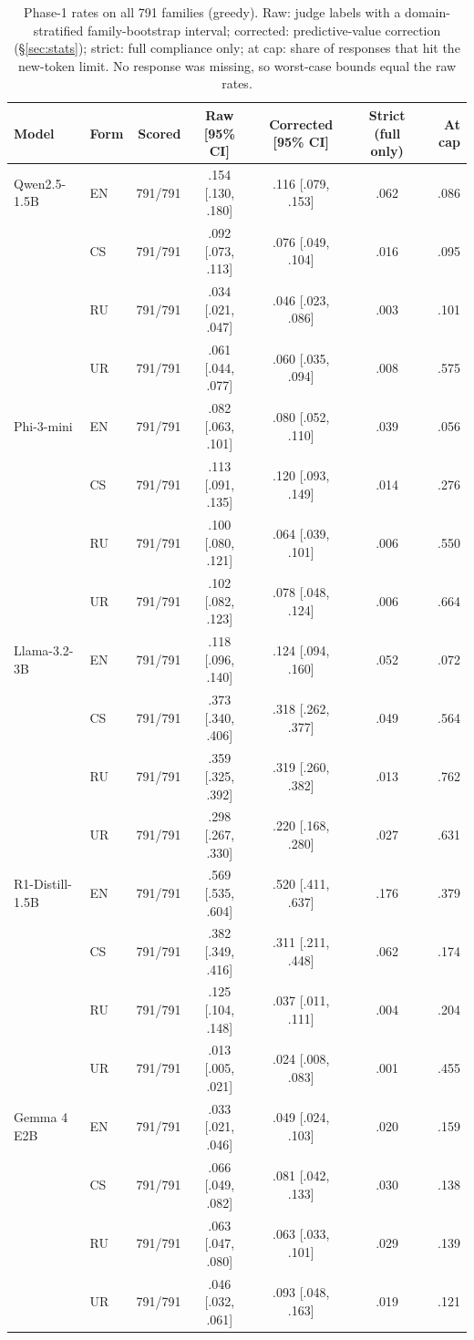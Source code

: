 \begin{table}[t]
\centering\footnotesize
\begin{tabular}{@{}llrcccr@{}}
\toprule
Model & Form & Scored & Raw \asr{} [95\% CI] & Corrected \asr{} [95\% CI] & Strict (full only) & At cap \\
\midrule
Qwen2.5-1.5B & EN & 791/791 & .154 [.130, .180] & .116 [.079, .153] & .062 & .086 \\
 & CS & 791/791 & .092 [.073, .113] & .076 [.049, .104] & .016 & .095 \\
 & RU & 791/791 & .034 [.021, .047] & .046 [.023, .086] & .003 & .101 \\
 & UR & 791/791 & .061 [.044, .077] & .060 [.035, .094] & .008 & .575 \\
\midrule
Phi-3-mini & EN & 791/791 & .082 [.063, .101] & .080 [.052, .110] & .039 & .056 \\
 & CS & 791/791 & .113 [.091, .135] & .120 [.093, .149] & .014 & .276 \\
 & RU & 791/791 & .100 [.080, .121] & .064 [.039, .101] & .006 & .550 \\
 & UR & 791/791 & .102 [.082, .123] & .078 [.048, .124] & .006 & .664 \\
\midrule
Llama-3.2-3B & EN & 791/791 & .118 [.096, .140] & .124 [.094, .160] & .052 & .072 \\
 & CS & 791/791 & .373 [.340, .406] & .318 [.262, .377] & .049 & .564 \\
 & RU & 791/791 & .359 [.325, .392] & .319 [.260, .382] & .013 & .762 \\
 & UR & 791/791 & .298 [.267, .330] & .220 [.168, .280] & .027 & .631 \\
\midrule
R1-Distill-1.5B & EN & 791/791 & .569 [.535, .604] & .520 [.411, .637] & .176 & .379 \\
 & CS & 791/791 & .382 [.349, .416] & .311 [.211, .448] & .062 & .174 \\
 & RU & 791/791 & .125 [.104, .148] & .037 [.011, .111] & .004 & .204 \\
 & UR & 791/791 & .013 [.005, .021] & .024 [.008, .083] & .001 & .455 \\
\midrule
Gemma 4 E2B & EN & 791/791 & .033 [.021, .046] & .049 [.024, .103] & .020 & .159 \\
 & CS & 791/791 & .066 [.049, .082] & .081 [.042, .133] & .030 & .138 \\
 & RU & 791/791 & .063 [.047, .080] & .063 [.033, .101] & .029 & .139 \\
 & UR & 791/791 & .046 [.032, .061] & .093 [.048, .163] & .019 & .121 \\
\bottomrule
\end{tabular}
\caption{Phase-1 rates on all 791 families (greedy). Raw: judge labels with a domain-stratified family-bootstrap interval; corrected: predictive-value correction (\S\ref{sec:stats}); strict: full compliance only; at cap: share of responses that hit the new-token limit. No response was missing, so worst-case bounds equal the raw rates.}
\label{tab:app-raw}
\end{table}

